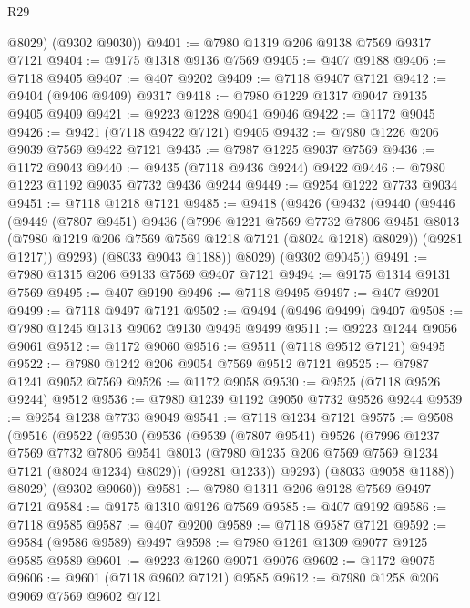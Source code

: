 \begin{lexlean}{R29}
\begin{coremodule}
        @8029)
      (@9302 @9030))
@9401 := @7980 @1319 @206 @9138 @7569 @9317 @7121
@9404 := @9175 @1318 @9136 @7569
@9405 := @407 @9188
@9406 := @7118 @9405
@9407 := @407 @9202
@9409 := @7118 @9407 @7121
@9412 := @9404 (@9406 @9409) @9317
@9418 := @7980 @1229 @1317 @9047 @9135 @9405 @9409
@9421 := @9223 @1228 @9041 @9046
@9422 := @1172 @9045
@9426 := @9421 (@7118 @9422 @7121) @9405
@9432 := @7980 @1226 @206 @9039 @7569 @9422 @7121
@9435 := @7987 @1225 @9037 @7569
@9436 := @1172 @9043
@9440 := @9435 (@7118 @9436 @9244) @9422
@9446 := @7980 @1223 @1192 @9035 @7732 @9436 @9244
@9449 := @9254 @1222 @7733 @9034
@9451 := @7118 @1218 @7121
@9485 := @9418
    (@9426
      (@9432
        (@9440
          (@9446
            (@9449
              (@7807 @9451)
              @9436
              (@7996
                @1221
                @7569
                @7732
                @7806
                @9451
                @8013
                (@7980 @1219 @206 @7569 @7569 @1218 @7121 (@8024 @1218) @8029))
              (@9281 @1217))
            @9293)
          (@8033 @9043 @1188))
        @8029)
      (@9302 @9045))
@9491 := @7980 @1315 @206 @9133 @7569 @9407 @7121
@9494 := @9175 @1314 @9131 @7569
@9495 := @407 @9190
@9496 := @7118 @9495
@9497 := @407 @9201
@9499 := @7118 @9497 @7121
@9502 := @9494 (@9496 @9499) @9407
@9508 := @7980 @1245 @1313 @9062 @9130 @9495 @9499
@9511 := @9223 @1244 @9056 @9061
@9512 := @1172 @9060
@9516 := @9511 (@7118 @9512 @7121) @9495
@9522 := @7980 @1242 @206 @9054 @7569 @9512 @7121
@9525 := @7987 @1241 @9052 @7569
@9526 := @1172 @9058
@9530 := @9525 (@7118 @9526 @9244) @9512
@9536 := @7980 @1239 @1192 @9050 @7732 @9526 @9244
@9539 := @9254 @1238 @7733 @9049
@9541 := @7118 @1234 @7121
@9575 := @9508
    (@9516
      (@9522
        (@9530
          (@9536
            (@9539
              (@7807 @9541)
              @9526
              (@7996
                @1237
                @7569
                @7732
                @7806
                @9541
                @8013
                (@7980 @1235 @206 @7569 @7569 @1234 @7121 (@8024 @1234) @8029))
              (@9281 @1233))
            @9293)
          (@8033 @9058 @1188))
        @8029)
      (@9302 @9060))
@9581 := @7980 @1311 @206 @9128 @7569 @9497 @7121
@9584 := @9175 @1310 @9126 @7569
@9585 := @407 @9192
@9586 := @7118 @9585
@9587 := @407 @9200
@9589 := @7118 @9587 @7121
@9592 := @9584 (@9586 @9589) @9497
@9598 := @7980 @1261 @1309 @9077 @9125 @9585 @9589
@9601 := @9223 @1260 @9071 @9076
@9602 := @1172 @9075
@9606 := @9601 (@7118 @9602 @7121) @9585
@9612 := @7980 @1258 @206 @9069 @7569 @9602 @7121

\end{coremodule}
\end{lexlean}
